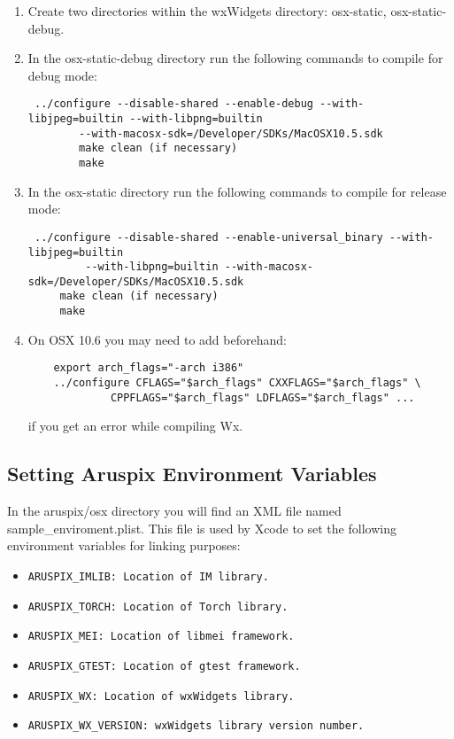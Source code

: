 \documentclass[]{article}
\begin{document}
\begin{enumerate}
	\item Create two directories within the wxWidgets directory: osx-static, osx-static-debug.
	\item In the osx-static-debug directory run the following commands to compile for debug mode:
	\begin{verbatim} ../configure --disable-shared --enable-debug --with-libjpeg=builtin --with-libpng=builtin 
     	--with-macosx-sdk=/Developer/SDKs/MacOSX10.5.sdk
 		make clean (if necessary)
 		make
	\end{verbatim}

	\item In the osx-static directory run the following commands to compile for release mode:
	\begin{verbatim} ../configure --disable-shared --enable-universal_binary --with-libjpeg=builtin
	     --with-libpng=builtin --with-macosx-sdk=/Developer/SDKs/MacOSX10.5.sdk 
	 make clean (if necessary)
	 make
	\end{verbatim}
	\item On OSX 10.6 you may need to add beforehand:
	\begin{verbatim}
	export arch_flags="-arch i386"
	../configure CFLAGS="$arch_flags" CXXFLAGS="$arch_flags" \
             CPPFLAGS="$arch_flags" LDFLAGS="$arch_flags" ...
	\end{verbatim}
	if you get an error while compiling Wx.
\end{enumerate}


\subsection{Setting Aruspix Environment Variables}
	In the aruspix/osx directory you will find an XML file named sample\_enviroment.plist. This
	file is used by Xcode to set the following environment variables for linking purposes:
	\begin{itemize}
		\item \begin{verbatim}ARUSPIX_IMLIB: Location of IM library.\end{verbatim}
		\item \begin{verbatim}ARUSPIX_TORCH: Location of Torch library.\end{verbatim}
		\item \begin{verbatim}ARUSPIX_MEI: Location of libmei framework.\end{verbatim}
		\item \begin{verbatim}ARUSPIX_GTEST: Location of gtest framework.\end{verbatim}
		\item \begin{verbatim}ARUSPIX_WX: Location of wxWidgets library.\end{verbatim}
		\item \begin{verbatim}ARUSPIX_WX_VERSION: wxWidgets library version number.\end{verbatim}
	\end{itemize}
\end{document}
